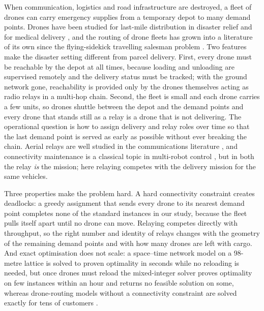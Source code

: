 \documentclass[final,5p,times,twocolumn]{elsarticle}
\begin{document}
When communication, logistics and road infrastructure are destroyed, a fleet of drones can carry
emergency supplies from a temporary depot to many demand points. Drones have been studied
for last-mile distribution in disaster relief \cite{chowdhury2017,rabta2018,erdelj2017} and for
medical delivery \cite{kim2017,ghelichi2021}, and the routing of drone fleets has grown into a
literature of its own since the flying-sidekick travelling salesman problem
\cite{murray2015,otto2018,macrina2020,chung2020}. Two features make the disaster setting
different from parcel delivery. First, every drone must be reachable by the depot at all
times, because loading and unloading are supervised remotely and the delivery status must be
tracked; with the ground network gone, reachability is provided only by the drones themselves
acting as radio relays in a multi-hop chain. Second, the fleet is small and each drone carries a
few units, so drones shuttle between the depot and the demand points and every drone that stands
still as a relay is a drone that is not delivering. The operational question is how to assign
delivery and relay roles over time so that the last demand point is served as early as possible
without ever breaking the chain. Aerial relays are well studied in the communications literature
\cite{zeng2016,mozaffari2019,burdakov2010}, and connectivity maintenance is a classical topic in
multi-robot control \cite{zavlanos2011,dixon2009}, but in both the relay \emph{is} the mission;
here relaying competes with the delivery mission for the same vehicles.

Three properties make the problem hard. A hard connectivity constraint creates deadlocks: a greedy
assignment that sends every drone to its nearest demand point completes none of the standard
instances in our study, because the fleet pulls itself apart until no drone can move. Relaying
competes directly with throughput, so the right number and identity of relays changes with the
geometry of the remaining demand points and with how many drones are left with cargo. And exact
optimisation does not scale: a space--time network model \cite{ford1962,skutella2009} on a
98-metre lattice is solved to proven optimality in seconds while no reloading is needed, but once
drones must reload the mixed-integer solver proves optimality on few instances within an hour and
returns no feasible solution on some, whereas drone-routing models without a connectivity
constraint are solved exactly for tens of customers \cite{roberti2021}.
\end{document}
